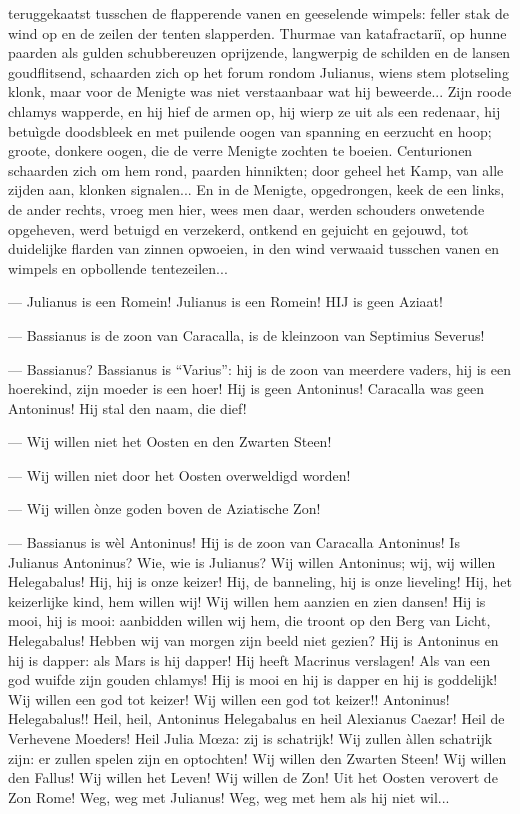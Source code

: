 \documentclass[a4paper, 12pt, oneside, dutch]{article}
\begin{document}
teruggekaatst tusschen de flapperende vanen en geeselende wimpels: feller stak de wind op en de zeilen der tenten slapperden. Thurmae van katafractariï, op hunne paarden als gulden schubbereuzen oprijzende, langwerpig de schilden en de lansen goudflitsend, schaarden zich op het forum rondom Julianus, wiens stem plotseling klonk, maar voor de Menigte was niet verstaanbaar wat hij beweerde... Zijn roode chlamys wapperde, en hij hief de armen op, hij wierp ze uit als een redenaar, hij betuìgde doodsbleek en met puilende oogen van spanning en eerzucht en hoop; groote, donkere oogen, die de verre Menigte zochten te boeien. Centurionen schaarden zich om hem rond, paarden hinnikten; door geheel het Kamp, van alle zijden aan, klonken signalen... En in de Menigte, opgedrongen, keek de een links, de ander rechts, vroeg men hier, wees men daar, werden schouders onwetende opgeheven, werd betuigd en verzekerd, ontkend en gejuicht en gejouwd, tot duidelijke flarden van zinnen opwoeien, in den wind verwaaid tusschen vanen en wimpels en opbollende tentezeilen...

--- Julianus is een Romein! Julianus is een Romein! HIJ is geen Aziaat!

--- Bassianus is de zoon van Caracalla, is de kleinzoon van Septimius Severus!

--- Bassianus? Bassianus is "`Varius"': hij is de zoon van meerdere vaders, hij is een hoerekind, zijn moeder is een hoer! Hij is geen Antoninus! Caracalla was geen Antoninus! Hij stal den naam, die dief!

--- Wij willen niet het Oosten en den Zwarten Steen!

--- Wij willen niet door het Oosten overweldigd worden!

--- Wij willen ònze goden boven de Aziatische Zon!

--- Bassianus is wèl Antoninus! Hij is de zoon van Caracalla Antoninus! Is Julianus Antoninus? Wie, wie is Julianus? Wij willen Antoninus; wij, wij willen Helegabalus! Hij, hij is onze keizer! Hij, de banneling, hij is onze lieveling! Hij, het keizerlijke kind, hem willen wij! Wij willen hem aanzien en zien dansen! Hij is mooi, hij is mooi: aanbidden willen wij hem, die troont op den Berg van Licht, Helegabalus! Hebben wij van morgen zijn beeld niet gezien? Hij is Antoninus en hij is dapper: als Mars is hij dapper! Hij heeft Macrinus verslagen! Als van een god wuifde zijn gouden chlamys! Hij is mooi en hij is dapper en hij is goddelijk! Wij willen een god tot keizer! Wij willen een god tot keizer!! Antoninus! Helegabalus!! Heil, heil, Antoninus Helegabalus en heil Alexianus Caezar! Heil de Verhevene Moeders! Heil Julia Mœza: zij is schatrijk! Wij zullen àllen schatrijk zijn: er zullen spelen zijn en optochten! Wij willen den Zwarten Steen! Wij willen den Fallus! Wij willen het Leven! Wij willen de Zon! Uit het Oosten verovert de Zon Rome! Weg, weg met Julianus! Weg, weg met hem als hij niet wil...
\end{document}
